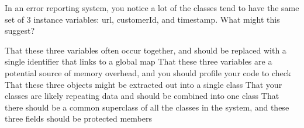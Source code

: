 \documentclass{exam}
\begin{document}
\begin{questions}
\question[1] In an error reporting system, you notice a lot of the classes tend to have the same set of 3 instance variables: url, customerId, and timestamp.  What might this suggest?

\begin{choices}
\choice That these three variables often occur together, and should be replaced with a single identifier that links to a global map
\choice That these three variables are a potential source of memory overhead, and you should profile your code to check
\correctchoice That these three objects might be extracted out into a single class
\choice That your classes are likely repeating data and should be combined into one class
\choice That there should be a common superclass of all the classes in the system, and these three fields should be protected members\
\end{choices}




\end{questions}
\end{document}
